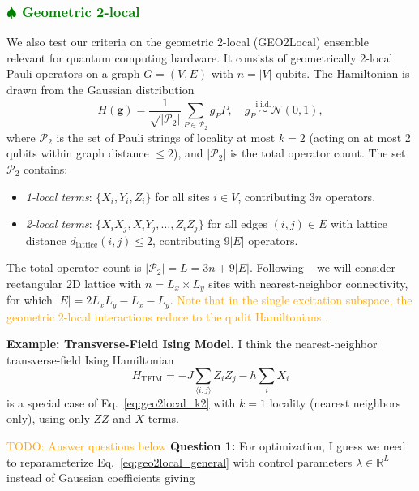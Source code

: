 \documentclass[aps,prx,reprint,superscriptaddress,footnote, twocolumn,notitlepage]{revtex4-2}
\newcommand{\tom}[1]{\textcolor{green}{#1}}
\newcommand{\ko}[1]{\textcolor{orange}{#1}}
\newcommand{\todotom}[1]{\tom{$\spadesuit$ #1}}
\begin{document}
 \subsubsection{\todotom{Geometric 2-local}} \label{sec:geo2}
 We also test our criteria on the geometric 2-local (GEO2Local) ensemble~\cite{quek2025quantumadvantagerandomgeometricallytwolocal} relevant for quantum computing hardware.
It consists of geometrically 2-local Pauli operators on a graph $G = (V, E)$ with $n = |V|$ qubits. The Hamiltonian is drawn from the Gaussian distribution
\begin{equation}
H(\mathbf{g}) = \frac{1}{\sqrt{|\mathcal{P}_2|}} \sum_{P \in \mathcal{P}_2} g_P P, \quad g_P \stackrel{\text{i.i.d.}}{\sim} \mathcal{N}(0, 1),
\label{eq:geo2local_general}
\end{equation}
where $\mathcal{P}_2$ is the set of Pauli strings of locality at most $k=2$ (acting on at most 2 qubits within graph distance $\leq 2$), and $|\mathcal{P}_2|$ is the total operator count. The set $\mathcal{P}_2$ contains:
\begin{itemize}
\item \emph{1-local terms}: $\{X_i, Y_i, Z_i\}$ for all sites $i \in V$, contributing $3n$ operators.
\item \emph{2-local terms}: $\{X_i X_j, X_i Y_j, \ldots, Z_i Z_j\}$ for all edges $(i,j) \in E$ with lattice distance $d_{\text{lattice}}(i,j) \leq 2$, contributing $9|E|$ operators.
\end{itemize}
The total operator count is $|\mathcal{P}_2| = L = 3n + 9|E|$. Following ~\cite{quek2025quantumadvantagerandomgeometricallytwolocal} we will consider rectangular 2D lattice with $n = L_x \times L_y$ sites with nearest-neighbor connectivity, for which $|E| = 2L_x L_y - L_x - L_y$. \ko{Note that in the single excitation subspace, the geometric 2-local interactions reduce to the qudit Hamiltonians \cite{wang_symmetry_2012,schirmer_design_2018}.}


\textbf{Example: Transverse-Field Ising Model.} I think the nearest-neighbor transverse-field Ising Hamiltonian
\begin{equation}
H_{\text{TFIM}} = -J \sum_{\langle i,j \rangle} Z_i Z_j - h \sum_i X_i
\end{equation}
is a special case of Eq.~\eqref{eq:geo2local_k2} with $k=1$ locality (nearest neighbors only), using only $ZZ$ and $X$ terms. 


\ko{TODO: Answer questions below}
\textbf{Question 1:}
For optimization, I guess we need to reparameterize Eq.~\eqref{eq:geo2local_general} with control parameters $\lambda \in \mathbb{R}^L$ instead of Gaussian coefficients giving
\end{document}
